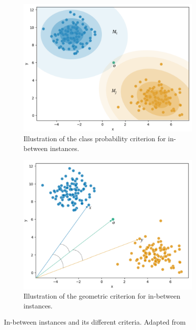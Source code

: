 \begin{figure}[htbp]
    \vspace{0.5cm}
    \begin{subfigure}[b]{0.475\textwidth}
        \includegraphics[width=\textwidth]{images/ibi_probability.png}
        \caption{Illustration of the class probability criterion for in-between instances.}
        \label{fig:ibi_probability}
    \end{subfigure}
    \hfill
    \begin{subfigure}[b]{0.475\textwidth}
        \includegraphics[width=\textwidth]{images/ibi_angle.png}
        \caption{ Illustration of the geometric criterion for in-between instances.}
        \label{fig:ibi_angle}
    \end{subfigure}
    \caption{In-between instances and its different criteria. Adapted from \cite{Kazempour24}}
    \label{fig:ibi}
\end{figure}

